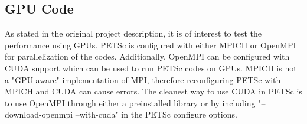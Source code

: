 \documentclass[]{article}
\theoremstyle{definition}
\begin{document}
\subsection{GPU Code}

As stated in the original project description, it is of interest to test the performance using GPUs.  PETSc is configured with either MPICH or OpenMPI for parallelization of the codes.  Additionally, OpenMPI can be configured with CUDA support which can be used to run PETSc codes on GPUs.  MPICH is not a "GPU-aware" implementation of MPI, therefore reconfiguring PETSc with MPICH and CUDA can cause errors.  The cleanest way to use CUDA in PETSc is to use OpenMPI through either a preinstalled library or by including "--download-openmpi --with-cuda" in the PETSc configure options.


\printbibliography 
\end{document}
